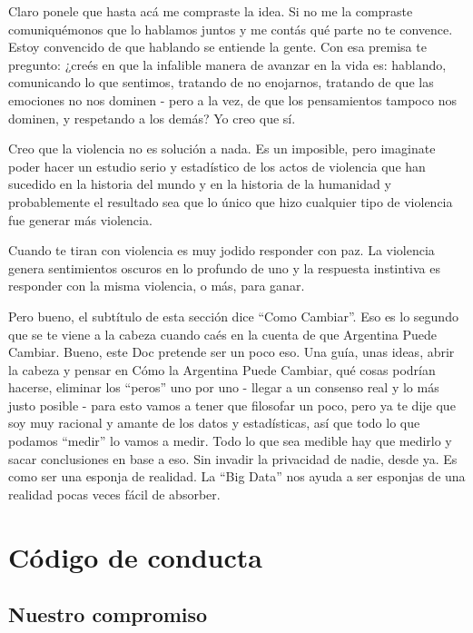 \documentclass[
]{book}
\begin{document}
Claro ponele que hasta acá me compraste la idea. Si no me la compraste comuniquémonos que lo hablamos juntos y me contás qué parte no te convence. Estoy convencido de que hablando se entiende la gente. Con esa premisa te pregunto: ¿creés en que la infalible manera de avanzar en la vida es: hablando, comunicando lo que sentimos, tratando de no enojarnos, tratando de que las emociones no nos dominen - pero a la vez, de que los pensamientos tampoco nos dominen, y respetando a los demás? Yo creo que sí.

Creo que la violencia no es solución a nada. Es un imposible, pero imaginate poder hacer un estudio serio y estadístico de los actos de violencia que han sucedido en la historia del mundo y en la historia de la humanidad y probablemente el resultado sea que lo único que hizo cualquier tipo de violencia fue generar más violencia.

Cuando te tiran con violencia es muy jodido responder con paz. La violencia genera sentimientos oscuros en lo profundo de uno y la respuesta instintiva es responder con la misma violencia, o más, para ganar.

Pero bueno, el subtítulo de esta sección dice ``Como Cambiar''. Eso es lo segundo que se te viene a la cabeza cuando caés en la cuenta de que Argentina Puede Cambiar. Bueno, este Doc pretende ser un poco eso. Una guía, unas ideas, abrir la cabeza y pensar en Cómo la Argentina Puede Cambiar, qué cosas podrían hacerse, eliminar los ``peros'' uno por uno - llegar a un consenso real y lo más justo posible - para esto vamos a tener que filosofar un poco, pero ya te dije que soy muy racional y amante de los datos y estadísticas, así que todo lo que podamos ``medir'' lo vamos a medir. Todo lo que sea medible hay que medirlo y sacar conclusiones en base a eso. Sin invadir la privacidad de nadie, desde ya. Es como ser una esponja de realidad. La ``Big Data'' nos ayuda a ser esponjas de una realidad pocas veces fácil de absorber.

\hypertarget{appendix-apuxe9ndice}{%
\appendix}


\hypertarget{codigo-de-conducta}{%
\chapter{Código de conducta}\label{codigo-de-conducta}}

\hypertarget{nuestro-compromiso}{%
\section{Nuestro compromiso}\label{nuestro-compromiso}}
\end{document}
